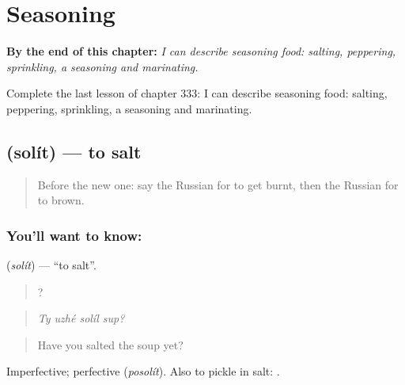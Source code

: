 
\chapter{Seasoning}
\label{ch:ru-seasoning}

\begin{chapteropening}
\textbf{By the end of this chapter:} \emph{I can describe seasoning food: salting, peppering, sprinkling, a seasoning and marinating.}

Complete the last lesson of chapter 333: I can describe seasoning food: salting, peppering, sprinkling, a seasoning and marinating.
\end{chapteropening}

\section[\texorpdfstring{\ru{солить} (solít)}{солить (solít)}]{ (solít) — to salt}

\label{lesson:RU-C333-solit}



\begin{quote}
Before the new one: say the Russian for to get burnt, then the Russian for to brown.
\end{quote}

\subsection*{You'll want to know: }
\textbf{} (\emph{solít}) — \textquotedblleft{}to salt\textquotedblright{}.

\begin{quote}
   ?
\end{quote}

\begin{quote}
\emph{Ty uzhé solíl sup?}
\end{quote}

\begin{quote}
Have you salted the soup yet?
\end{quote}

Imperfective; perfective \emph{} (\emph{posolít}). Also to pickle in salt: \emph{ }.

